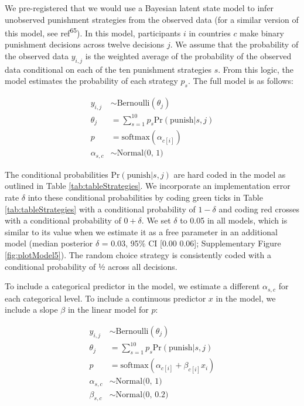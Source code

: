 \documentclass[
  man,floatsintext]{apa6}
\begin{document}
We pre-registered that we would use a Bayesian latent state model to infer
unobserved punishment strategies from the observed data (for a similar version
of this model, see ref\textsuperscript{65}). In this model, participants \(i\) in
countries \(c\) make binary punishment decisions across twelve decisions \(j\). We
assume that the probability of the observed data \(y_{i,j}\) is the weighted
average of the probability of the observed data conditional on each of the ten
punishment strategies \(s\). From this logic, the model estimates the probability
of each strategy \(p_{s}\). The full model is as follows:

\begin{align}
y_{i,j} &\sim \text{Bernoulli}(\theta_{j}) \\
\theta_{j} &= \sum_{s=1}^{10} p_{s} \text{Pr}(\text{punish}|s,j) \nonumber \\
p &= \text{softmax}(\alpha_{c[i]}) \nonumber \\
\alpha_{s,c} &\sim \text{Normal(0, 1)} \nonumber
\end{align}

The conditional probabilities \(\text{Pr}(\text{punish}|s,j)\) are hard coded in
the model as outlined in Table \ref{tab:tableStrategies}. We incorporate an
implementation error rate \(\delta\) into these conditional probabilities by coding
green ticks in Table \ref{tab:tableStrategies} with a conditional probability
of \(1 - \delta\) and coding red crosses with a conditional probability of
\(0 + \delta\). We set \(\delta\) to 0.05 in all models, which is similar to its
value when we estimate it as a free parameter in an additional model (median
posterior \(\delta\) = 0.03, 95\% CI
{[}0.00 0.06{]};
Supplementary Figure \ref{fig:plotModel5}). The random choice strategy is
consistently coded with a conditional probability of ½ across all decisions.

To include a categorical predictor in the model, we estimate a different
\(\alpha_{s,c}\) for each categorical level. To include a continuous predictor
\(x\) in the model, we include a slope \(\beta\) in the linear model for \(p\):

\begin{align}
y_{i,j} &\sim \text{Bernoulli}(\theta_{j}) \\
\theta_{j} &= \sum_{s=1}^{10} p_{s} \text{Pr}(\text{punish}|s,j) \nonumber \\
p &= \text{softmax}(\alpha_{c[i]} + \beta_{c[i]}x_{i}) \nonumber \\
\alpha_{s,c} &\sim \text{Normal(0, 1)} \nonumber \\
\beta_{s,c} &\sim \text{Normal(0, 0.2)} \nonumber
\end{align}
\end{document}
